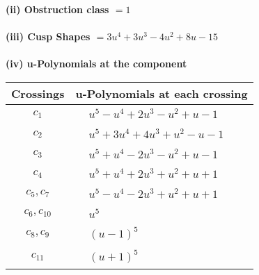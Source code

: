 \documentclass[1p]{elsarticle_modified}
\theoremstyle{definition}
\begin{document}
\flushleft \textbf{(ii) Obstruction class $= 1$}\\~\\
\flushleft \textbf{(iii) Cusp Shapes $= 3 u^4+3 u^3-4 u^2+8 u-15$}\\~\\
\newpage\renewcommand{\arraystretch}{1}
\flushleft \textbf{(iv) u-Polynomials at the component}\newline \\
\begin{tabular}{m{50pt}|m{274pt}}
Crossings & \hspace{64pt}u-Polynomials at each crossing \\
\hline $$\begin{aligned}c_{1}\end{aligned}$$&$\begin{aligned}
&u^5- u^4+2 u^3- u^2+u-1
\end{aligned}$\\
\hline $$\begin{aligned}c_{2}\end{aligned}$$&$\begin{aligned}
&u^5+3 u^4+4 u^3+u^2- u-1
\end{aligned}$\\
\hline $$\begin{aligned}c_{3}\end{aligned}$$&$\begin{aligned}
&u^5+u^4-2 u^3- u^2+u-1
\end{aligned}$\\
\hline $$\begin{aligned}c_{4}\end{aligned}$$&$\begin{aligned}
&u^5+u^4+2 u^3+u^2+u+1
\end{aligned}$\\
\hline $$\begin{aligned}c_{5},c_{7}\end{aligned}$$&$\begin{aligned}
&u^5- u^4-2 u^3+u^2+u+1
\end{aligned}$\\
\hline $$\begin{aligned}c_{6},c_{10}\end{aligned}$$&$\begin{aligned}
&u^5
\end{aligned}$\\
\hline $$\begin{aligned}c_{8},c_{9}\end{aligned}$$&$\begin{aligned}
&(u-1)^5
\end{aligned}$\\
\hline $$\begin{aligned}c_{11}\end{aligned}$$&$\begin{aligned}
&(u+1)^5
\end{aligned}$\\
\hline
\end{tabular}\\~\\
\end{document}
